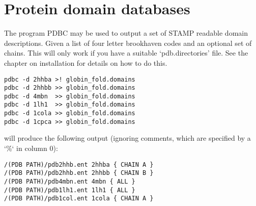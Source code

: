 \section{Protein domain databases}

The program PDBC may be used to output a set of STAMP readable
domain descriptions.  Given a list of four letter brookhaven
codes and an optional set of chains.  This will only work if you have
a suitable `pdb.directories' file.  See the chapter on installation for details
on how to do this.

\begin{scriptsize}\begin{verbatim}
pdbc -d 2hhba >! globin_fold.domains
pdbc -d 2hhbb >> globin_fold.domains
pdbc -d 4mbn  >> globin_fold.domains
pdbc -d 1lh1  >> globin_fold.domains
pdbc -d 1cola >> globin_fold.domains
pdbc -d 1cpca >> globin_fold.domains
\end{verbatim} \end{scriptsize}

will produce the following output (ignoring comments, which are specified by a `\%`
in column 0):

\begin{scriptsize}\begin{verbatim}
/(PDB PATH)/pdb2hhb.ent 2hhba { CHAIN A }
/(PDB PATH)/pdb2hhb.ent 2hhbb { CHAIN B }
/(PDB PATH)/pdb4mbn.ent 4mbn { ALL }
/(PDB PATH)/pdb1lh1.ent 1lh1 { ALL }
/(PDB PATH)/pdb1col.ent 1cola { CHAIN A }
\end{verbatim} \end{scriptsize}

